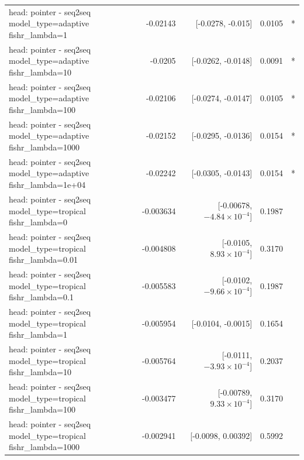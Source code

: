 \documentclass[10pt]{article}
\makeatletter
\newcommand{\stackcell}[1]{\begin{tabular}[t]{@{}l@{}}#1\end{tabular}}
\makeatother
\begin{document}
{\begin{longtable}{lrrrl}
\stackcell{head: pointer - seq2seq\\\footnotesize model\_type=adaptive fishr\_lambda=1 } & -0.02143 & [-0.0278, -0.015] & 0.0105 & *\\
\stackcell{head: pointer - seq2seq\\\footnotesize model\_type=adaptive fishr\_lambda=10 } & -0.0205 & [-0.0262, -0.0148] & 0.0091 & *\\
\stackcell{head: pointer - seq2seq\\\footnotesize model\_type=adaptive fishr\_lambda=100 } & -0.02106 & [-0.0274, -0.0147] & 0.0105 & *\\
\stackcell{head: pointer - seq2seq\\\footnotesize model\_type=adaptive fishr\_lambda=1000 } & -0.02152 & [-0.0295, -0.0136] & 0.0154 & *\\
\stackcell{head: pointer - seq2seq\\\footnotesize model\_type=adaptive fishr\_lambda=1e+04 } & -0.02242 & [-0.0305, -0.0143] & 0.0154 & *\\
\stackcell{head: pointer - seq2seq\\\footnotesize model\_type=tropical fishr\_lambda=0 } & -0.003634 & [-0.00678, $-4.84\times10^{-4}$] & 0.1987 & \\
\stackcell{head: pointer - seq2seq\\\footnotesize model\_type=tropical fishr\_lambda=0.01 } & -0.004808 & [-0.0105, $8.93\times10^{-4}$] & 0.3170 & \\
\stackcell{head: pointer - seq2seq\\\footnotesize model\_type=tropical fishr\_lambda=0.1 } & -0.005583 & [-0.0102, $-9.66\times10^{-4}$] & 0.1987 & \\
\stackcell{head: pointer - seq2seq\\\footnotesize model\_type=tropical fishr\_lambda=1 } & -0.005954 & [-0.0104, -0.0015] & 0.1654 & \\
\stackcell{head: pointer - seq2seq\\\footnotesize model\_type=tropical fishr\_lambda=10 } & -0.005764 & [-0.0111, $-3.93\times10^{-4}$] & 0.2037 & \\
\stackcell{head: pointer - seq2seq\\\footnotesize model\_type=tropical fishr\_lambda=100 } & -0.003477 & [-0.00789, $9.33\times10^{-4}$] & 0.3170 & \\
\stackcell{head: pointer - seq2seq\\\footnotesize model\_type=tropical fishr\_lambda=1000 } & -0.002941 & [-0.0098, 0.00392] & 0.5992 & \\

\end{longtable}}
\end{document}
